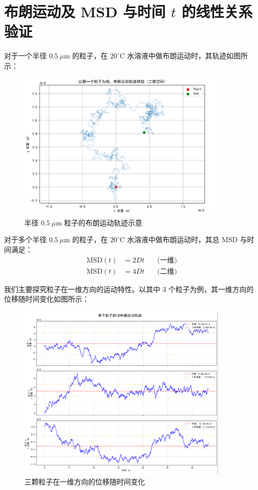 \documentclass[a4paper]{report} %
\begin{document}
\section{布朗运动及 MSD 与时间 $t$ 的线性关系验证}

对于一个半径 $0.5~\mu\text{m}$ 的粒子，在 $20^\circ$C 水溶液中做布朗运动时，其轨迹如图所示：
\begin{figure}[htbp]
  \centering
  \includegraphics[width=0.9\textwidth]{trajectory.png}
  \caption{半径 $0.5~\mu$m 粒子的布朗运动轨迹示意}
  \label{fig:trajectory}
\end{figure}

对于多个半径 $0.5~\mu\text{m}$ 的粒子，在 $20^\circ$C 水溶液中做布朗运动时，其总 MSD 与时间满足：
\begin{align}
  \text{MSD}(t) &= 2Dt \quad &\text{(一维)} \\
  \text{MSD}(t) &= 4Dt \quad &\text{(二维)}
\end{align}

我们主要探究粒子在一维方向的运动特性。以其中 3 个粒子为例，其一维方向的位移随时间变化如图所示：

\begin{figure}[htbp]
  \centering
  \includegraphics[width=0.9\textwidth]{displacement.png}
  \caption{三颗粒子在一维方向的位移随时间变化}
  \label{fig:displacement}
\end{figure}
\end{document}
